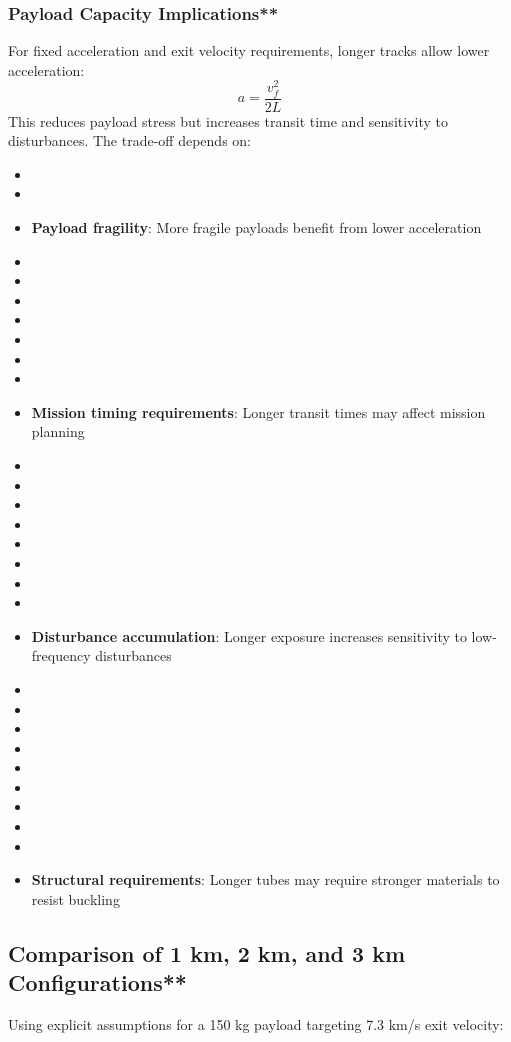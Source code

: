 \subsubsection{Payload Capacity Implications**}
For fixed acceleration and exit velocity requirements, longer tracks allow lower acceleration:
\begin{equation}
a = \frac{v_f^2}{2L}
\end{equation}
This reduces payload stress but increases transit time and sensitivity to disturbances. The trade-off depends on:
\begin{itemize}
    \item \item \item \textbf{Payload fragility}: More fragile payloads benefit from lower acceleration
    \item \item \item \item \item \item \item \item \textbf{Mission timing requirements}: Longer transit times may affect mission planning
    \item \item \item \item \item \item \item \item \item \textbf{Disturbance accumulation}: Longer exposure increases sensitivity to low-frequency disturbances
    \item \item \item \item \item \item \item \item \item \item \textbf{Structural requirements}: Longer tubes may require stronger materials to resist buckling \cite{timoshenko1961}
\end{itemize}

\subsection{Comparison of 1 km, 2 km, and 3 km Configurations**}
Using explicit assumptions for a 150 kg payload targeting 7.3 km/s exit velocity:

